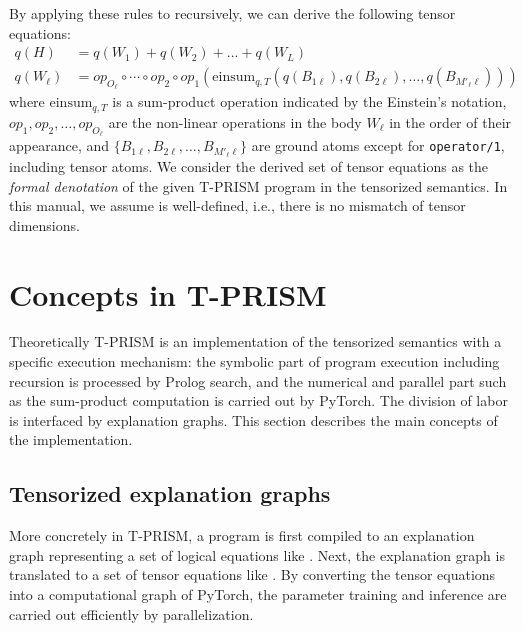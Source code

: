 \documentclass[a4paper]{report}
\newcommand{\einsum}{\mbox{einsum}}
\begin{document}
By applying these rules to  recursively, we
can derive the following tensor equations:
%
\begin{align}\nonumber
q(H) & = q(W_1) + q(W_2) + ... + q(W_{L}) \\
q(W_{\ell}) & = op_{O_\ell} \circ \cdots \circ op_{2} \circ op_{1}
\left(\einsum_{q,T}(q(B_{1\ell}), q(B_{2\ell}), \ldots, q(B_{M'_\ell \ell}))\right)
\label{eq:tprism_eqs}
\end{align}
%
where $\einsum_{q,T}$ is a sum-product operation indicated by the
Einstein's notation, $op_1, op_2, \ldots, op_{O_\ell}$ are the non-linear
operations in the body $W_\ell$ in the order of their appearance, and
$\{B_{1\ell}, B_{2\ell},\ldots, B_{M'_\ell \ell}\}$ are
ground atoms except for {\tt operator/1}, including tensor atoms. We
consider the derived set of tensor equations as the {\em formal
	denotation\/} of the given T-PRISM program in the tensorized
semantics.
In this manual, we assume  is well-defined,
i.e., there is no mismatch of tensor dimensions.

\section{Concepts in T-PRISM}
\label{sec:concepts}
Theoretically T-PRISM is an implementation of the tensorized semantics
with a specific execution mechanism: the symbolic part of program
execution including recursion is processed by Prolog search, and the
numerical and parallel part such as the sum-product computation is
carried out by PyTorch.  The division of labor is interfaced by
explanation graphs.  This section describes the main concepts of the
implementation.

\subsection*{Tensorized explanation graphs}
More  concretely  in  T-PRISM,  a  program is  first  compiled  to  an
explanation   graph   representing   a  set   of   logical   equations
like   .  Next,   the  explanation   graph  is
translated      to      a       set      of      tensor      equations
like  . By  converting  the tensor  equations
into a  computational graph of PyTorch, the  parameter training and  inference are
carried out efficiently by parallelization.
\end{document}
